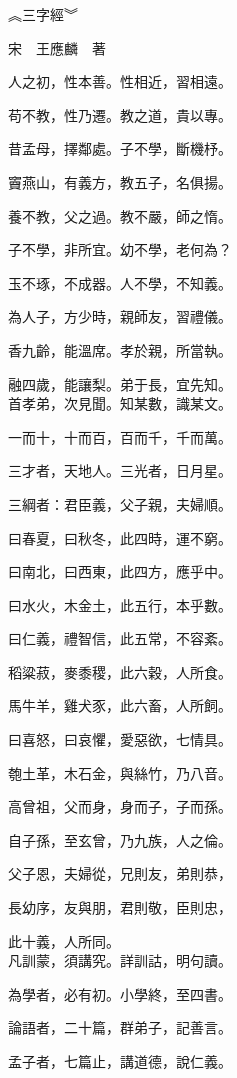 \documentclass[20pt,a4paper,twocolumn]{article}
\begin{document}
\begin{Huge}
︽三字經︾

宋　王應麟　著
\\

\end{Huge}
\begin{Large}
人之初，性本善。性相近，習相遠。

苟不教，性乃遷。教之道，貴以專。

昔孟母，擇鄰處。子不學，斷機杼。

竇燕山，有義方，教五子，名俱揚。

養不教，父之過。教不嚴，師之惰。

子不學，非所宜。幼不學，老何為？

玉不琢，不成器。人不學，不知義。

為人子，方少時，親師友，習禮儀。

香九齡，能溫席。孝於親，所當執。

融四歲，能讓梨。弟于長，宜先知。
\\

首孝弟，次見聞。知某數，識某文。

一而十，十而百，百而千，千而萬。

三才者，天地人。三光者，日月星。

三綱者：君臣義，父子親，夫婦順。

曰春夏，曰秋冬，此四時，運不窮。

曰南北，曰西東，此四方，應乎中。

曰水火，木金土，此五行，本乎數。

曰仁義，禮智信，此五常，不容紊。

稻粱菽，麥黍稷，此六穀，人所食。

馬牛羊，雞犬豕，此六畜，人所飼。

曰喜怒，曰哀懼，愛惡欲，七情具。

匏土革，木石金，與絲竹，乃八音。

高曾祖，父而身，身而子，子而孫。

自子孫，至玄曾，乃九族，人之倫。

父子恩，夫婦從，兄則友，弟則恭，

長幼序，友與朋，君則敬，臣則忠，

此十義，人所同。
\\

凡訓蒙，須講究。詳訓詁，明句讀。

為學者，必有初。小學終，至四書。

論語者，二十篇，群弟子，記善言。

孟子者，七篇止，講道德，說仁義。


\end{Large}
\end{document}

